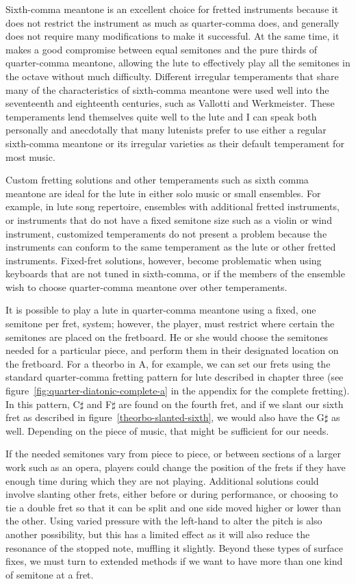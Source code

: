 Sixth-comma meantone is an excellent choice for fretted instruments because it does not
restrict the instrument as much as quarter-comma does, and generally does not require
many modifications to make it successful. At the same time, it makes a good compromise
between equal semitones and the pure thirds of quarter-comma meantone, allowing the
lute to effectively play all the semitones in the octave without much difficulty.
Different irregular temperaments that share many of the characteristics of sixth-comma
meantone were used well into the seventeenth and eighteenth centuries, such as Vallotti
and Werkmeister. These temperaments lend themselves quite well to the lute and I can
speak both personally and anecdotally that many lutenists prefer to use either a
regular sixth-comma meantone or its irregular varieties as their default temperament
for most music.

Custom fretting solutions and other temperaments such as sixth comma meantone are ideal
for the lute in either solo music or small ensembles.  For example, in lute song
repertoire, ensembles with additional fretted instruments, or instruments that do not
have a fixed semitone size such as a violin or wind instrument, customized temperaments
do not present a problem because the instruments can conform to the same temperament as
the lute or other fretted instruments. Fixed-fret solutions, however, become
problematic when using keyboards that are not tuned in sixth-comma, or if the members
of the ensemble wish to choose quarter-comma meantone over other temperaments.

It is possible to play a lute in quarter-comma meantone using a fixed, one semitone per
fret, system; however, the player, must restrict where certain the semitones are
placed on the fretboard.  He or she would choose the semitones needed for a particular
piece, and perform them in their designated location on the fretboard.  For a theorbo
in A, for example, we can set our frets using the standard quarter-comma fretting
pattern for lute described in chapter three (see figure~\ref{fig:quarter-diatonic-complete-a}
in the appendix for the complete fretting).  In this pattern, C$\sharp$ and F$\sharp$
are found on the fourth fret, and if we slant our sixth fret as described in
figure~\ref{theorbo-slanted-sixth}, we would also have the G$\sharp$ as well. Depending
on the piece of music, that might be sufficient for our needs.

If the needed semitones vary from piece to piece, or between sections of a larger work
such as an opera, players could change the position of the frets if they have enough
time during which they are not playing. Additional solutions could involve slanting
other frets, either before or during performance, or choosing to tie a double fret so
that it can be split and one side moved higher or lower than the other. Using varied
pressure with the left-hand to alter the pitch is also another possibility, but this
has a limited effect as it will also reduce the resonance of the stopped note, muffling
it slightly. Beyond these types of surface fixes, we must turn to extended methods if
we want to have more than one kind of semitone at a fret.

